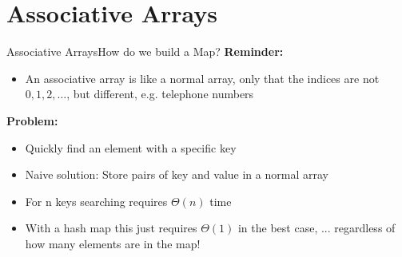\section{Associative Arrays}


\begin{frame}{Associative Arrays}{How do we build a Map?}
  \textbf{Reminder:}
  \begin{itemize}
  \item An associative array is like a normal array, only that
    the indices are not {\color{MainA}$0, 1, 2, \ldots$}, but
    different, e.g. telephone numbers
  \end{itemize}
  \textbf{Problem:}
  \begin{itemize}
  \item Quickly find an element with a specific key
  \item Naive solution: Store pairs of key and value
    in a normal array
  \item For {\color{MainA}n} keys searching requires {\color{MainA} $\Theta(n)$} time
  \item With a {\color{MainA}hash map} this just requires {\color{MainA} $\Theta(1)$}
    in the best case, ... regardless of how many elements are in the map!
  \end{itemize}
\end{frame}


